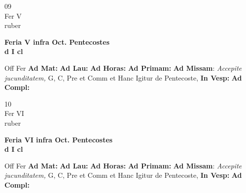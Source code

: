 \documentclass[10pt, openany]{book}
\begin{document}
    \begin{center}
        \begin{minipage}{3.5in}
            \vspace{2em}
            \begin{minipage}{0.5in}
                {\Huge 09} \\
                {\normalsize Fer V} \\
                {\normalsize ruber}
            \end{minipage}
            \begin{minipage}{3.0in}
                \textbf{ \large Feria V infra Oct. Pentecostes \\
                \textnormal{\normalsize d I cl}} \\ 
            \end{minipage}
            \begin{justify}Off Fer
                \textbf{Ad Mat: }
                \textbf{Ad Lau: }
                \textbf{Ad Horas: }
                \textbf{Ad Primam: }\textbf{Ad Missam}: \textit{Accepite jucunditatem,} G, C, Pre et Comm et Hanc Igitur de Pentecoste,  
                \textbf{In Vesp: }
                \textbf{Ad Compl: }
            \end{justify}
        \end{minipage}
    \end{center}

    \begin{center}
        \begin{minipage}{3.5in}
            \vspace{2em}
            \begin{minipage}{0.5in}
                {\Huge 10} \\
                {\normalsize Fer VI} \\
                {\normalsize ruber}
            \end{minipage}
            \begin{minipage}{3.0in}
                \textbf{ \large Feria VI infra Oct. Pentecostes \\
                \textnormal{\normalsize d I cl}} \\ 
            \end{minipage}
            \begin{justify}Off Fer
                \textbf{Ad Mat: }
                \textbf{Ad Lau: }
                \textbf{Ad Horas: }
                \textbf{Ad Primam: }\textbf{Ad Missam}: \textit{Accepite jucunditatem,} G, C, Pre et Comm et Hanc Igitur de Pentecoste,  
                \textbf{In Vesp: }
                \textbf{Ad Compl: }
            \end{justify}
        \end{minipage}
    \end{center}
\end{document}
